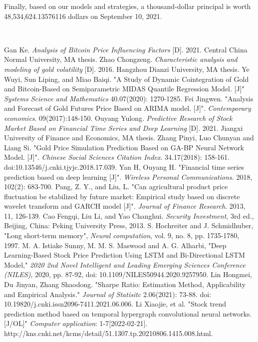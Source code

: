 \documentclass[12pt]{article}
\begin{document}
Finally, based on our models and strategies, a thousand-dollar principal is worth 48,534,624.13576116 dollars on September 10, 2021.

\hspace*{\fill}\\


\newpage
\begin{thebibliography}{99}
 Gan Ke. \emph{Analysis of Bitcoin Price Influencing Factors} [D]. 2021. Central China Normal University, MA thesis. 
 Zhao Chongzeng. \emph{Characteristic analysis and modeling of gold volatility} [D]. 2016. Hangzhou Dianzi University, MA thesis.
 Ye Wuyi, Sun Liping, and Miao Baiqi. "A Study of Dynamic Cointegration of Gold and Bitcoin-Based on Semiparametric MIDAS Quantile Regression Model. [J]" \emph{Systems Science and Mathematics} 40.07(2020): 1270-1285.
 Fei Jingwen. "Analysis and Forecast of Gold Futures Price Based on ARIMA model. [J]". \emph{Contemporary economics}. 09(2017):148-150.
 Ouyang Yulong. \emph{Predictive Research of Stock Market Based on Financial Time Series and Deep Learning} [D]. 2021. Jiangxi University of Finance and Economics, MA thesis.
 Zhang Pinyi, Luo Chunyan and Liang Si. "Gold Price Simulation Prediction Based on GA-BP Neural Network Model. [J]". \emph{Chinese Social Sciences Citation Index}. 34.17(2018): 158-161. doi:10.13546/j.cnki.tjyjc.2018.17.039.
 Yan H, Ouyang H. "Financial time series prediction based on deep learning [J]". \emph{Wireless Personal Communications}. 2018, 102(2): 683-700.
 Pang, Z. Y., and Liu, L. "Can agricultural product price fluctuation be stabilized by future market: Empirical study based on discrete wavelet transform and GARCH model [J]". \emph{Journal of Finance Research}. 2013, 11, 126-139.
 Cao Fengqi, Liu Li, and Yao Changhui. \emph{Security Investment}, 3rd ed., Beijing, China: Peking University Press, 2013.
 S. Hochreiter and J. Schmidhuber, "Long short-term memory", \emph{Neural computation}, vol. 9, no. 8, pp. 1735-1780, 1997.
 M. A. Istiake Sunny, M. M. S. Maswood and A. G. Alharbi, "Deep Learning-Based Stock Price Prediction Using LSTM and Bi-Directional LSTM Model," \emph{2020 2nd Novel Intelligent and Leading Emerging Sciences Conference (NILES)}, 2020, pp. 87-92, doi: 10.1109/NILES50944.2020.9257950.
 Lin Hongmei, Du Jinyan, Zhang Shaodong. "Sharpe Ratio: Estimation Method, Applicability and Empirical Analysis." \emph{Journal of Statisitc} 2.06(2021): 73-88. doi: 10.19820/j.cnki.issn2096-7411.2021.06.006.
 Li Xiaojie, et al. "Stock trend prediction method based on
temporal hypergraph convolutional neural networks.[J/OL]" \emph{Computer application}: 1-7[2022-02-21]. http://kns.cnki.net/kcms/detail/51.1307.tp.20210806.1415.008.html.
\end{thebibliography}
\end{document}
